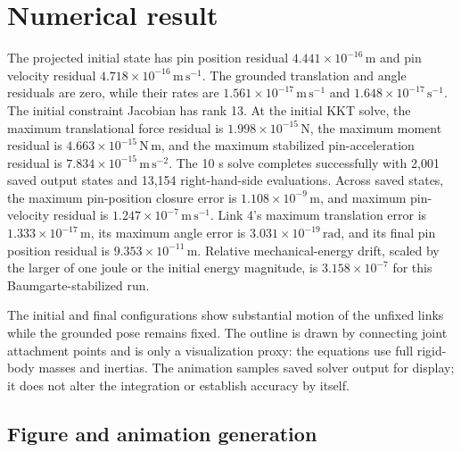 \documentclass[../main.tex]{subfiles}
\begin{document}
\section{Numerical result}
The projected initial state has pin position residual \(4.441\times10^{-16}\,\mathrm m\) and pin velocity residual \(4.718\times10^{-16}\,\mathrm{m\,s^{-1}}\). The grounded translation and angle residuals are zero, while their rates are \(1.561\times10^{-17}\,\mathrm{m\,s^{-1}}\) and \(1.648\times10^{-17}\,\mathrm{s^{-1}}\). The initial constraint Jacobian has rank 13. At the initial KKT solve, the maximum translational force residual is \(1.998\times10^{-15}\,\mathrm N\), the maximum moment residual is \(4.663\times10^{-15}\,\mathrm{N\,m}\), and the maximum stabilized pin-acceleration residual is \(7.834\times10^{-15}\,\mathrm{m\,s^{-2}}\). The 10 s solve completes successfully with 2,001 saved output states and 13,154 right-hand-side evaluations. Across saved states, the maximum pin-position closure error is \(1.108\times10^{-9}\,\mathrm m\), and maximum pin-velocity residual is \(1.247\times10^{-7}\,\mathrm{m\,s^{-1}}\). Link 4's maximum translation error is \(1.333\times10^{-17}\,\mathrm m\), its maximum angle error is \(3.031\times10^{-19}\,\mathrm{rad}\), and its final pin position residual is \(9.353\times10^{-11}\,\mathrm m\). Relative mechanical-energy drift, scaled by the larger of one joule or the initial energy magnitude, is \(3.158\times10^{-7}\) for this Baumgarte-stabilized run.

The initial and final configurations show substantial motion of the unfixed links while the grounded pose remains fixed. The outline is drawn by connecting joint attachment points and is only a visualization proxy: the equations use full rigid-body masses and inertias. The animation samples saved solver output for display; it does not alter the integration or establish accuracy by itself.

\subsection{Figure and animation generation}
\end{document}

